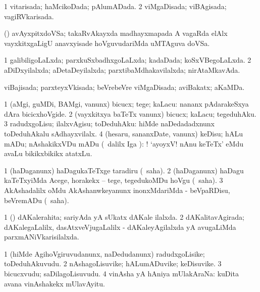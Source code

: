 \bentry
{} 
\gl{\gu}
\expl{}
\bmng
\bnum
\num{1} vitarisada; haMcikoDada; pAlumADada. 
\num{2} viMgaDisada; viBAgisada; vagiRVkarisada. 
\enum
\emng

\noindent
\gl{\pagu}
\expl{}
\bmng
{} (\takaR) avAyxpitxdoVSa; takaRvAkayxda madhayxmapada A vagaRda elAlx vayxkitxgaLigU anavxyisade hoVguvudariMda uMTAguva doVSa. 
\emng
\eentry

\bentry
{} 
\gl{\gu}
\expl{}
\bmng
\bnum
\num{1} galibiligoLaLxda; parxkuSxbadhxgoLaLxda; kadaDada; koSxVBegoLaLxda. 
\num{2} aDiDxyilalxda; aDetaDeyilalxda; parxtibaMdhakavilalxda; nirAtaMkavAda. 
\enum
\emng
\eentry

\bentry
{} 
\gl{\gu}
\expl{}
\bmng
 viBajisada; parxteyxVkisada; beVrebeVre viMgaDisada; aviBakatx; aKaMDa. 
\emng
\eentry

\bentry
{} 
\gl{\akirx}
\bmng
\bnum
\num{1} (aMgi, guMDi, BAMgi, \mo vanunx) bicucx; tege; kaLacu:  nananx pAdarakeSxya dAra bicicxhoVgide. 
\num{2} (vayxkitxya baTeTx \mo vanunx) bicucx; kaLacu; tegeduhAku. 
\num{3} radudxgoLisu; ilalxvAgisu; toDeduhAku:  hiMde naDedadadxnunx toDeduhAkalu sAdhayxvilalx. 
\num{4} (hesaru, sananxDate, \mo vanunx) keDisu; hALu mADu; nAshakikxVDu mADu (\kanmu\ \BUkaq dalilx Iga \viparx): !  `ayoyxV! nAnu keTeTx' eMdu avaLu bikikxbikikx atatxLu. 
\enum
\emng
\eentry

\bentry
{} 
\gl{\sakirx}
\expl{}
\bmng
\bnum
\num{1} (haDaganunx) haDagukaTeTxge taradiru (\akirx\ saha). 
\num{2} (haDaganunx) haDagu kaTeTxyiMda Acege, horakekx -- tege, tegedukoMDu hoVgu (\akirx\ saha). 
\num{3} AkAshadalilx oMdu AkAshanwkeyanunx inonxMdariMda - beVpaRDisu, beVremADu (\akirx\ saha). 
\enum
\emng
\eentry

\bentry
{} 
\gl{\gu}
\expl{}
\bmng
\bnum
\num{1} (\ame) dAKalerahita; sariyAda yA sUkatx dAKale ilalxda. 
\num{2} dAKalitavAgirada; dAKalegaLalilx, dasAtxveVjugaLalilx - dAKaleyAgilalxda yA avugaLiMda parxmANiVkarisilalxda. 
\enum
\emng
\eentry

\bentry
{} 
\gl{\nA}
\expl{}
\bmng
\bnum
\num{1} (hiMde AgihoVgiruvudanunx, naDedudanunx) radudxgoLisike; toDeduhAkuvudu. 
\num{2} nAshagoLisuvike; hALumADuvike; keDisuvike. 
\num{3} bicucxvudu; saDilagoLisuvudu. 
\num{4} vinAsha yA hAniya mUlakAraNa:  kuDita avana vinAshakekx mUlavAyitu. 
\enum
\emng
\eentry

